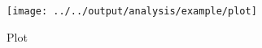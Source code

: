 \newpage{}

\begin{figure}[H]
\begin{centering}
\caption{Plot \label{fig:plot}}
\par\end{centering}
\begin{centering}
\emph{\smallskip{}
}
\par\end{centering}
\centering{}\texttt{[image: ../../output/analysis/example/plot]}
\end{figure}

